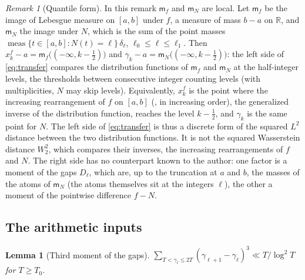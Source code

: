 \documentclass[11pt,a4paper]{article}
\makeatletter
\numberwithin{equation}{section}
\DeclareRobustCommand{\CGeqref}[1]{\eqref{#1}}
\DeclareRobustCommand{\CGcite}[2][]{\if\relax\detokenize{#1}\relax\cite{#2}\else\cite[#1]{#2}\fi}
\let\CG@origeqref\eqref
\newcommand{\CG@gettip}[1]{\@ifundefined{CGTip@#1}{#1}{\csname CGTip@#1\endcsname}}
\newcommand{\CG@getbib}[1]{\@ifundefined{CGBib@#1}{#1}{\csname CGBib@#1\endcsname}}
\DeclareRobustCommand{\CGeqref}[1]{\pdftooltip{\CG@origeqref{#1}}{\CG@gettip{#1}}}
\DeclareRobustCommand{\CGcite}[2][]{\pdftooltip{\if\relax\detokenize{#1}\relax\cite{#2}\else\cite[#1]{#2}\fi}{\CG@getbib{#2}}}
\newtheorem{lemma}[theorem]{Lemma}
\theoremstyle{definition}
\theoremstyle{remark}
\newtheorem{remark}[theorem]{Remark}
\newcommand{\meas}{\operatorname{meas}}
\newcommand{\R}{\mathbb R}
\makeatother
\begin{document}
\begin{remark}[Quantile form]\label{rem:quantile}
In this remark $\mathsf m_f$ and $\mathsf m_N$ are local. Let $\mathsf m_f$ be the image of Lebesgue measure on $[a,b]$ under $f$, a measure of mass $b-a$ on $\R$, and $\mathsf m_N$ the image under $N$, which is the sum of the point masses $\meas\{t\in[a,b]:N(t)=\ell\}\,\delta_\ell$, $\ell_0\le\ell\le\ell_1$. Then $x^f_k-a=\mathsf m_f\bigl((-\infty,k-\tfrac12)\bigr)$ and $\gamma_k-a=\mathsf m_N\bigl((-\infty,k-\tfrac12)\bigr)$: the left side of \CGeqref{eq:transfer} compares the distribution functions of $\mathsf m_f$ and $\mathsf m_N$ at the half-integer levels, the thresholds between consecutive integer counting levels (with multiplicities, $N$ may skip levels). Equivalently, $x^f_k$ is the point where the increasing rearrangement of $f$ on $[a,b]$ (\CGcite[\S10.12]{HardyLittlewoodPolya1934}, in increasing order), the generalized inverse of the distribution function, reaches the level $k-\frac12$, and $\gamma_k$ is the same point for $N$. The left side of \CGeqref{eq:transfer} is thus a discrete form of the squared $L^2$ distance between the two distribution functions. It is not the squared Wasserstein distance $W_2^2$, which compares their inverses, the increasing rearrangements of $f$ and $N$. The right side has no counterpart known to the author: one factor is a moment of the gaps $D_\ell$, which are, up to the truncation at $a$ and $b$, the masses of the atoms of $\mathsf m_N$ (the atoms themselves sit at the integers $\ell$), the other a moment of the pointwise difference $f-N$.
\end{remark}

\subsection{The arithmetic inputs}\label{subsec:arith_inputs}

\begin{lemma}[Third moment of the gaps]\label{lem:gaps}
$\sum_{T<\gamma_\ell\le2T}(\gamma_{\ell+1}-\gamma_\ell)^3\ll T/\log^2T$ for $T\ge T_0$.
\end{lemma}
\end{document}
